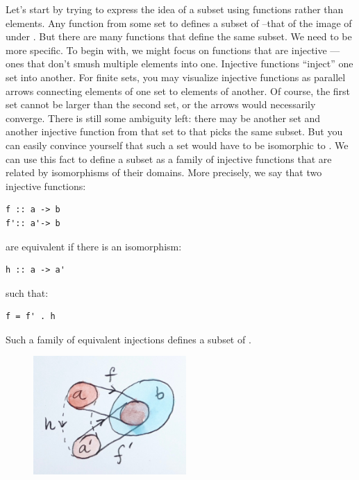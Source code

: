 Let's start by trying to express the idea of a subset using functions
rather than elements. Any function  from some set 
to  defines a subset of --that of the image of
 under . But there are many functions that define
the same subset. We need to be more specific. To begin with, we might
focus on functions that are injective --- ones that don't smush multiple
elements into one. Injective functions ``inject'' one set into another.
For finite sets, you may visualize injective functions as parallel
arrows connecting elements of one set to elements of another. Of course,
the first set cannot be larger than the second set, or the arrows would
necessarily converge. There is still some ambiguity left: there may be
another set  and another injective function
 from that set to  that picks the same
subset. But you can easily convince yourself that such a set would have
to be isomorphic to . We can use this fact to define a subset
as a family of injective functions that are related by isomorphisms of
their domains. More precisely, we say that two injective functions:

\begin{Verbatim}[commandchars=\\\{\}]
f :: a -> b
f':: a'-> b
\end{Verbatim}
are equivalent if there is an isomorphism:

\begin{Verbatim}[commandchars=\\\{\}]
h :: a -> a'
\end{Verbatim}
such that:

\begin{Verbatim}[commandchars=\\\{\}]
f = f' . h
\end{Verbatim}
Such a family of equivalent injections defines a subset of .

\begin{figure}[H]
\centering
\includegraphics[width=2.29167in]{images/subsetinjection.jpg}
\end{figure}

